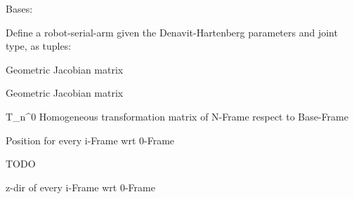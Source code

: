 \documentclass[letterpaper,10pt,english]{sphinxmanual}
\begin{document}
\begin{fulllineitems}
\label{\detokenize{_src/didactic:rkd.didactic.core.Robot}}
Bases: 

Define a robot-serial-arm given the Denavit-Hartenberg parameters 
and joint type, as tuples:

\begin{fulllineitems}
\label{\detokenize{_src/didactic:rkd.didactic.core.Robot.J}}
Geometric Jacobian matrix

\end{fulllineitems}


\begin{fulllineitems}
\label{\detokenize{_src/didactic:rkd.didactic.core.Robot.J_i}}
Geometric Jacobian matrix

\end{fulllineitems}


\begin{fulllineitems}
\label{\detokenize{_src/didactic:rkd.didactic.core.Robot.T}}
T\_n\textasciicircum{}0 
Homogeneous transformation matrix of N-Frame respect to Base-Frame

\end{fulllineitems}


\begin{fulllineitems}
\label{\detokenize{_src/didactic:rkd.didactic.core.Robot.p}}
Position for every i-Frame wrt 0-Frame

\end{fulllineitems}


\begin{fulllineitems}
\label{\detokenize{_src/didactic:rkd.didactic.core.Robot.plot_workspace}}
TODO

\end{fulllineitems}


\begin{fulllineitems}
\label{\detokenize{_src/didactic:rkd.didactic.core.Robot.z}}
z-dir of every i-Frame wrt 0-Frame

\end{fulllineitems}


\end{fulllineitems}
\end{document}

